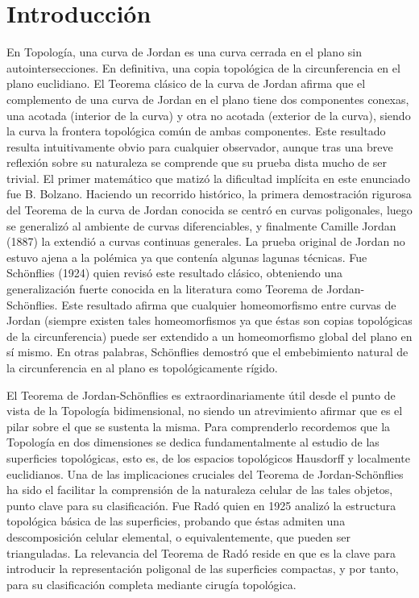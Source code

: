 \chapter*{Introducción}
En Topología, una curva de Jordan es una curva cerrada en el plano sin autointersecciones. En definitiva, una copia topológica de la circunferencia en el plano euclidiano. El Teorema clásico de la curva de Jordan  afirma que el complemento de una curva de Jordan en el plano tiene dos componentes conexas, una acotada (interior de la curva) y otra no acotada   (exterior de la curva), siendo la curva la frontera topológica común  de ambas componentes. Este resultado resulta intuitivamente obvio para cualquier observador, aunque tras una breve reflexión sobre su naturaleza se comprende  que su prueba dista mucho de ser trivial. El primer matemático que matizó la dificultad implícita en este enunciado fue B. Bolzano. Haciendo un recorrido histórico, la primera demostración rigurosa del Teorema de la curva de Jordan conocida se centró en curvas poligonales, luego se generalizó al ambiente de curvas diferenciables, y finalmente   Camille Jordan (1887) la extendió a curvas continuas generales. La prueba original de Jordan no estuvo ajena a la polémica ya que contenía algunas lagunas técnicas. Fue Schönflies (1924) quien  revisó este resultado clásico,  obteniendo una generalización fuerte conocida en la literatura como Teorema de Jordan-Schönflies. Este resultado afirma que cualquier homeomorfismo entre   curvas de Jordan (siempre existen tales homeomorfismos ya que   éstas son copias topológicas de la circunferencia) puede ser extendido a un homeomorfismo global del plano en sí mismo. En otras palabras, Schönflies demostró que el embebimiento natural de la circunferencia en al plano es topológicamente rígido. 

El Teorema de Jordan-Schönflies es extraordinariamente útil desde el punto de vista de la Topología bidimensional, no siendo un atrevimiento  afirmar que es el pilar sobre el que se sustenta la misma. 
Para comprenderlo recordemos que la Topología en dos dimensiones se dedica fundamentalmente al estudio de las superficies topológicas, esto es, de los espacios topológicos  Hausdorff y localmente euclidianos.  Una de las implicaciones cruciales del Teorema de Jordan-Schönflies  ha sido el facilitar la comprensión de la naturaleza celular de las tales objetos, punto clave para su clasificación. Fue Radó quien en 1925  analizó la estructura topológica básica de las superficies, probando que  éstas admiten una descomposición celular elemental, o equivalentemente, que pueden ser  trianguladas. La relevancia del Teorema de Radó  reside en que  es la clave para introducir la representación poligonal de las superficies compactas, y por tanto, para  su clasificación completa mediante cirugía topológica.

